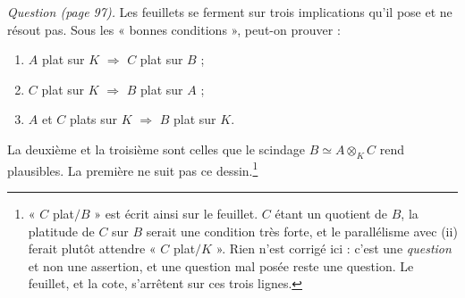 \documentclass[11pt,a4paper]{article}
\begin{document}
\emph{Question (page 97).} Les feuillets se ferment sur trois implications qu'il
pose et ne résout pas. Sous les « bonnes conditions », peut-on prouver :

\begin{enumerate}
  \item[(i)] $A$ plat sur $K$ $\Longrightarrow$ $C$ plat sur $B$ ;
  \item[(ii)] $C$ plat sur $K$ $\Longrightarrow$ $B$ plat sur $A$ ;
  \item[(iii)] $A$ et $C$ plats sur $K$ $\Longrightarrow$ $B$ plat sur $K$.
\end{enumerate}

La deuxième et la troisième sont celles que le scindage $B \simeq A \otimes_{K}
C$ rend plausibles. La première ne suit pas ce dessin.\footnote{« $C$ plat$/B$ »
est écrit ainsi sur le feuillet. $C$ étant un quotient de $B$, la platitude de
$C$ sur $B$ serait une condition très forte, et le parallélisme avec (ii)
ferait plutôt attendre « $C$ plat$/K$ ». Rien n'est corrigé ici : c'est une
\emph{question} et non une assertion, et une question mal posée reste une
question. Le feuillet, et la cote, s'arrêtent sur ces trois lignes.}
\end{document}
